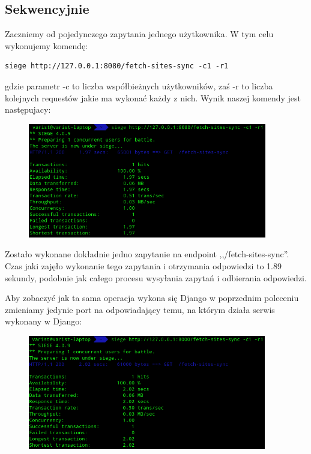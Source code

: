 \subsection{Sekwencyjnie}
Zaczniemy od pojedynczego zapytania jednego użytkownika. W tym celu wykonujemy komendę:
\begin{lstlisting}
siege http://127.0.0.1:8080/fetch-sites-sync -c1 -r1
\end{lstlisting}
gdzie parametr -c to liczba współbieżnych użytkowników, zaś -r to liczba kolejnych requestów jakie ma wykonać każdy z nich. Wynik naszej komendy jest następujacy:
\begin{figure}[H]
    \includegraphics[height=50mm]{zdjecia/1_req_sync_fast}
    \centering
\end{figure}
Zostało wykonane dokładnie jedno zapytanie na endpoint ,,/fetch-sites-sync''. Czas jaki zajęło wykonanie tego zapytania i otrzymania odpowiedzi to 1.89 sekundy, podobnie jak całego procesu wysyłania zapytań i odbierania odpowiedzi.

Aby zobaczyć jak ta sama operacja wykona się Django w poprzednim poleceniu zmieniamy jedynie port na odpowiadający temu, na którym działa serwis wykonany w Django:
\begin{figure}[H]
    \includegraphics[height=50mm]{zdjecia/1_req_sync_django}
    \centering
\end{figure}

